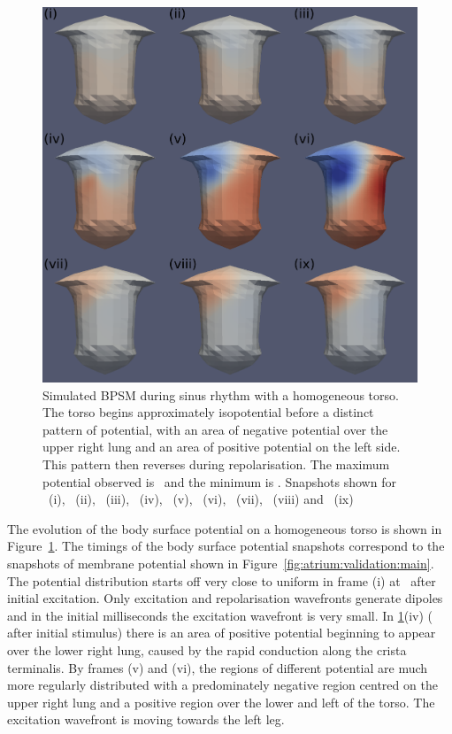 \begin{figure}
\includegraphics{figures/bsp/bsp_thorax}
\caption[Body Surface Potential snapshots, homogeneous torso]{
\label{bsp:fig:homo_bsp}
Simulated BPSM during sinus rhythm with a homogeneous
torso.
The torso begins approximately isopotential before a distinct pattern of
potential, with an area of negative potential over the upper right lung and an
area of positive potential on the left side.
This pattern then reverses during repolarisation.
The maximum potential observed is \ and the minimum is .
Snapshots shown for \ (i), \ (ii), \ (iii), \ (iv),
\ (v), \ (vi), \ (vii), \ (viii) and \
(ix)
}
\end{figure}

The evolution of the body surface potential on a homogeneous torso is shown in
Figure~\ref{bsp:fig:homo_bsp}.
The timings of the body surface potential snapshots correspond to the snapshots
of membrane potential shown in Figure~\ref{fig:atrium:validation:main}.
The potential distribution starts off very close to uniform in frame (i) at
\ms{10}\ after initial excitation.
Only excitation and repolarisation wavefronts generate dipoles and in the
initial milliseconds the excitation wavefront is very small.
In \ref{bsp:fig:homo_bsp}(iv) ( after initial stimulus) there is an area
of positive potential beginning to appear over the lower right lung, caused by
the rapid conduction along the crista terminalis.
By frames (v) and (vi), the regions of different potential are much more
regularly distributed with a predominately negative region centred on the upper
right lung and a positive region over the lower and left of the torso.
The excitation wavefront is moving towards the left leg.

